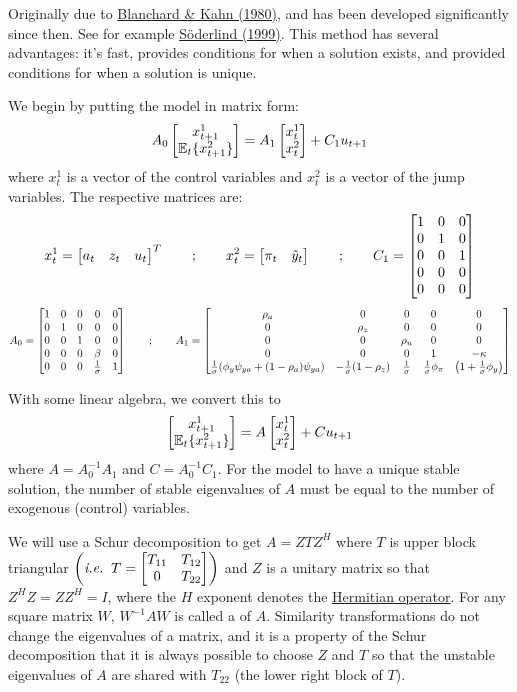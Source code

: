\documentclass[10pt]{article}
\begin{document}
\begin{example}
	Originally due to \href{https://www.jstor.org/stable/1912186?seq=1}{Blanchard \& Kahn (1980)}, and has been developed significantly since then. See for example \href{https://papers.ssrn.com/sol3/papers.cfm?abstract_id=1413242}{S\"{o}derlind (1999)}. This method has several advantages: it's fast, provides conditions for when a solution exists, and provided conditions for when a solution is unique.
	
	We begin by putting the model in matrix form:
	\[A_0 \begin{bmatrix}x_{t+1}^1 \\ \mathbb{E}_t \{x_{t+1}^2\}\end{bmatrix} = A_1 \begin{bmatrix}x_t^1 \\ x_t^2\end{bmatrix} + C_1 u_{t+1}\]where $x_t^1$ is a vector of the control variables and $x_t^2$ is a vector of the jump variables. The respective matrices are:
	\[
	x_t^1 =\begin{bmatrix}a_t & z_t & u_t\end{bmatrix}^T \qquad ; \qquad x_t^2 = \begin{bmatrix}\pi_t & \tilde{y}_t\end{bmatrix}\qquad ; \qquad C_1 = \begin{bmatrix}1 & 0 & 0 \\ 0 & 1 & 0 \\ 0 & 0 & 1 \\ 0 & 0 & 0 \\ 0 & 0 & 0\end{bmatrix}
	\]
	\[
	A_0 = \begin{bmatrix}1 & 0 & 0 & 0 & 0 \\ 0 & 1 & 0 & 0 & 0 \\ 0 & 0 & 1 & 0 & 0 \\ 0 & 0 & 0 & \beta & 0 \\ 0 & 0 & 0 & \frac{1}{\sigma} & 1\end{bmatrix}\qquad ;\qquad A_1 = \begin{bmatrix}\rho_a & 0 & 0 & 0 & 0 \\ 0 & \rho_z & 0 & 0 & 0 \\ 0 & 0 & \rho_u & 0 & 0 \\ 0 & 0 & 0 & 1 & -\kappa \\ \frac{1}{\sigma}(\phi_y \psi_{ya} + (1-\rho_a)\psi_{ya})  & -\frac{1}{\sigma}(1-\rho_z) & \frac{1}{\sigma} & \frac{1}{\sigma}\phi_\pi & \left( 1 +\frac{1}{\sigma} \phi_y\right) \end{bmatrix}
	\]
	
	With some linear algebra, we convert this to
	\[\begin{bmatrix}x_{t+1}^1 \\ \mathbb{E}_t \{x_{t+1}^2\}\end{bmatrix} = A \begin{bmatrix}x_t^1 \\ x_t^2\end{bmatrix} + C u_{t+1}\]where $A = A_0^{-1}A_1$ and $C = A_0^{-1}C_1$. For the model to have a unique stable solution, the number of stable eigenvalues of $A$ must be equal to the number of exogenous (control) variables. 
	
	We will use a Schur decomposition to get $A = ZTZ^H$ where $T$ is upper block triangular $\left( \emph{i.e.} \;\;T = \begin{bmatrix}T_{11} & T_{12} \\ 0 & T_{22}\end{bmatrix}\right)$ and $Z$ is a unitary matrix so that $Z^HZ = ZZ^H = I$, where the $H$ exponent denotes the \href{https://en.wikipedia.org/wiki/Hermitian_matrix}{Hermitian operator}. For any square matrix $W$, $W^{-1} AW$ is called a  of $A$. Similarity transformations do not change the eigenvalues of a matrix, and it is a property of the Schur decomposition that it is always possible to choose $Z$ and $T$ so that the unstable eigenvalues of $A$ are shared with $T_{22}$ (the lower right block of $T$).
	

\end{example}
\end{document}
